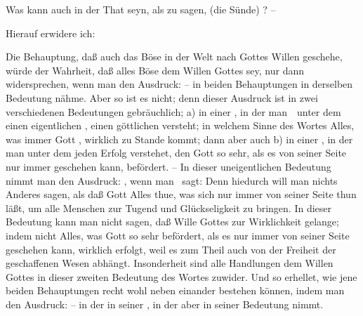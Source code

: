 \begin{aufza}
\begin{aufzb}
\item Was kann auch in der That  seyn, als zu sagen,  (die Sünde) ? -- \par
Hierauf erwidere ich:
\begin{aufzc} 
\item Die Behauptung, daß auch das Böse in der Welt nach Gottes Willen geschehe, würde der Wahrheit, daß alles Böse dem Willen Gottes  sey, nur dann widersprechen, wenn man den Ausdruck:  -- in beiden Behauptungen in derselben Bedeutung nähme. Aber so ist es nicht; denn dieser Ausdruck ist in zwei verschiedenen Bedeutungen gebräuchlich; 
a) in einer , in der man~\ unter dem  einen eigentlichen , einen göttlichen  versteht; in welchem Sinne des Wortes Alles, was immer Gott , wirklich zu Stande kommt; dann aber auch b) in einer , in der man unter dem  jeden Erfolg verstehet, den Gott so sehr, als es von seiner Seite nur immer geschehen kann, befördert. -- In dieser uneigentlichen Bedeutung nimmt man den Ausdruck: , wenn man \zB\ sagt:  Denn hiedurch will man nichts Anderes sagen, als daß Gott Alles thue, was sich nur immer von seiner Seite thun läßt, um alle Menschen zur Tugend und Glückseligkeit zu bringen. In dieser Bedeutung kann man nicht sagen, daß  Wille Gottes zur Wirklichkeit gelange; indem nicht Alles, was Gott so sehr befördert, als es nur immer von seiner Seite geschehen kann, wirklich erfolgt, weil es zum Theil auch von der Freiheit der geschaffenen Wesen abhängt. Insonderheit sind alle  Handlungen dem Willen Gottes in dieser zweiten Bedeutung des Wortes zuwider. Und so erhellet, wie jene beiden Behauptungen recht wohl neben einander bestehen können, indem man den Ausdruck:  -- in der  in seiner , in der  aber in seiner  Bedeutung nimmt.
\begin{RWanm}

\end{RWanm}
\end{aufzc}
\end{aufzb}
\end{aufza}
